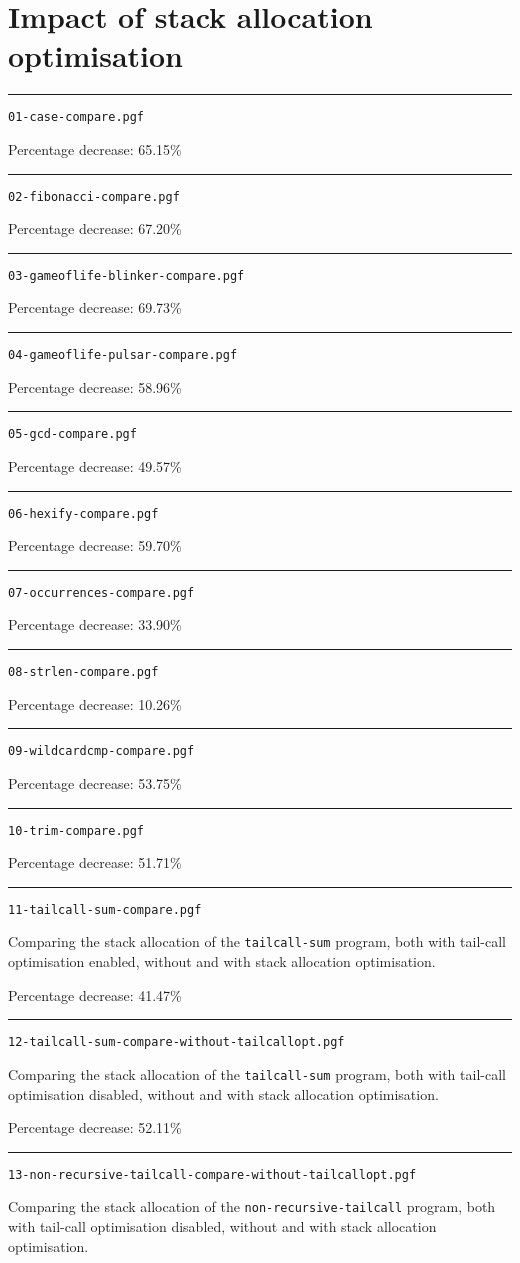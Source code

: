 \documentclass{article}
\newcommand{\plot}[1]{
\rule{\textwidth}{1pt}
\texttt{#1}

\fbox{\resizebox{\textwidth}{!}{}}
}
\begin{document}
\section{Impact of stack allocation optimisation}

\plot{01-case-compare.pgf}

Percentage decrease: 65.15\%


\plot{02-fibonacci-compare.pgf}

Percentage decrease: 67.20\%

\newpage
\plot{03-gameoflife-blinker-compare.pgf}

Percentage decrease: 69.73\%

\plot{04-gameoflife-pulsar-compare.pgf}

Percentage decrease: 58.96\%

\newpage
\plot{05-gcd-compare.pgf}

Percentage decrease: 49.57\%

\plot{06-hexify-compare.pgf}

Percentage decrease: 59.70\%

\newpage
\plot{07-occurrences-compare.pgf}

Percentage decrease: 33.90\%

\plot{08-strlen-compare.pgf}

Percentage decrease: 10.26\%

\newpage
\plot{09-wildcardcmp-compare.pgf}

Percentage decrease: 53.75\%


\plot{10-trim-compare.pgf}

Percentage decrease: 51.71\%

\newpage
\plot{11-tailcall-sum-compare.pgf}

Comparing the stack allocation of the \texttt{tailcall-sum} program, both with tail-call optimisation enabled, without and with stack allocation optimisation.

Percentage decrease: 41.47\%

\plot{12-tailcall-sum-compare-without-tailcallopt.pgf}

Comparing the stack allocation of the \texttt{tailcall-sum} program, both with tail-call optimisation disabled, without and with stack allocation optimisation.

Percentage decrease: 52.11\%

\newpage
\plot{13-non-recursive-tailcall-compare-without-tailcallopt.pgf}

Comparing the stack allocation of the \texttt{non-recursive-tailcall} program, both with tail-call optimisation disabled, without and with stack allocation optimisation.
\end{document}
